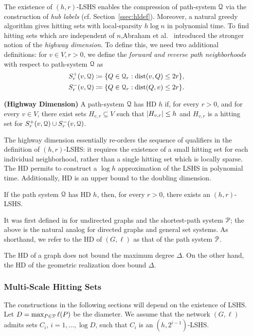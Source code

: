 The existence of $(h,r)$-LSHS enables the compression of path-system $\mathcal{Q}$ via the construction of \emph{hub labels} (cf. Section~\ref{ssec:hldef}). Moreover, a natural greedy algorithm gives hitting sets with local-sparsity $h\log n$ in polynomial time. To find hitting sets which are independent of $n$,Abraham et al.~\citep{highway2013} introduced the stronger notion of the \emph{highway dimension}. To define this, we need two additional definitions:
for $v\in V, r>0$, we define the \emph{forward and reverse path neighborhoods} with respect to path-system $\mathcal{Q}$ as 
\begin{align*}
S_r^+(v,\mathcal{Q}) &\coloneqq\{Q\in\mathcal{Q}_r: \mbox{dist}(v,Q)\leq 2r \}, \\  
S_r^-(v,\mathcal{Q}) &\coloneqq\{Q\in\mathcal{Q}_r: \mbox{dist}(Q,v)\leq 2r \}.
\end{align*}
\begin{definition}
\label{def:hddef}
\textbf{(Highway Dimension)}
A path-system $\mathcal{Q}$ has HD $h$ if, for every $r>0$, and for every $v\in V$, there exist sets $H_{v,r}\subseteq V$ such that $\lvert H_{v,r}\rvert\leq h$ and $H_{v,r}$ is a hitting set for $S_r^+(v,\mathcal{Q})\cup S_r^-(v,\mathcal{Q})$.
\end{definition}
The highway dimension essentially re-orders the sequence of qualifiers in the definition of $(h,r)$-LSHS: it requires the existence of a small hitting set for each individual neighborhood, rather than a single hitting set which is locally sparse. 
The HD permits to construct a $\log h$ approximation of the LSHS in polynomial time.
Additionally, HD is an upper bound to the doubling dimension.


\begin{proposition}
If the path system $\mathcal{Q}$ has HD $h$, then, for every $r>0$, there exists an $(h,r)$-LSHS.
\end{proposition}
It was first defined in \citet{highway2013} for undirected graphs and the shortest-path system $\mathcal{P}$; the above is the natural analog for directed graphs and general set systems. As shorthand, we refer to the HD of $(G,\ell)$ as that of the path system $\mathcal{P}$.

The HD of a graph does not bound the maximum degree $\Delta$.
On the other hand, the HD of the geometric realization does bound $\Delta$.


\subsubsection{Multi-Scale Hitting Sets} \label{sec:multi_scale}
The constructions in the following sections will depend on the existence of LSHS.
Let $D=\max_{P\in\mathcal{P}}\ell(P)$ be the diameter.
We assume that the network $(G,\ell)$ admits sets $C_i$, $i=1,\ldots,\log D$, such that $C_i$ is an $(h,2^{i-1})$-LSHS.

